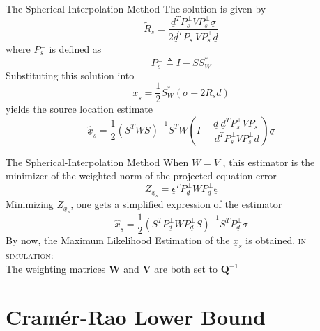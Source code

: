 \documentclass[10pt]{beamer}
\begin{document}
\begin{frame}{The Spherical-Interpolation Method}
  The solution is given by
  $$ \tilde{R}_s = \frac{\underline{d}^T P_s^{\bot}V P_s^{\bot}\underline{\sigma}}{2\underline{d}^T P_s^{\bot} V P_s^{\bot}\underline{d}}$$
  where $P_s^{\bot}$ is defined as
  $$P_s^{\bot} \triangleq I - SS_W^*$$
  Substituting this solution into
  $$ \underline{x}_s = \frac{1}{2} S_W^* (\underline{\sigma} - 2R_s\underline{d})$$
  yields the source location estimate
  $$ \hat{\underline{x}}_s = \frac{1}{2} (S^T W S)^{-1} S^T W (I - \frac{\underline{d}\ \underline{d}^T P_s^{\bot} V P_s^{\bot}} {\underline{d}^T P_s^{\bot} V P_s^{\bot} \underline{d}}) \underline{\sigma}$$
\end{frame}
\begin{frame}{The Spherical-Interpolation Method}
  When $W = V$ , this estimator is the minimizer of the weighted norm of the \alert{projected} equation error
  $$ Z_{\underline{x}_s} = \underline{\epsilon}^T P_{\underline{d}}^{\bot} W P_{\underline{d}}^{\bot} \underline{\epsilon} $$
  Minimizing $Z_{\underline{x}_s}$, one gets a simplified expression of the estimator
  $$ \hat{\underline{x}}_s = \frac{1}{2} (S^T  P_{\underline{d}}^{\bot} W P_{\underline{d}}^{\bot} S)^{-1} S^T P_{\underline{d}}^{\bot} \underline{\sigma} $$
  By now, the \alert{Maximum Likelihood Estimation} of the $\underline{x}_s$ is obtained.
  \vfill
  \textsc{in simulation:\\}
  The weighting matrices $\textbf{W}$ and $\textbf{V}$ are both set to $\textbf{Q}^{-1}$
\end{frame}

\section{Cram\'{e}r-Rao Lower Bound}
\end{document}
